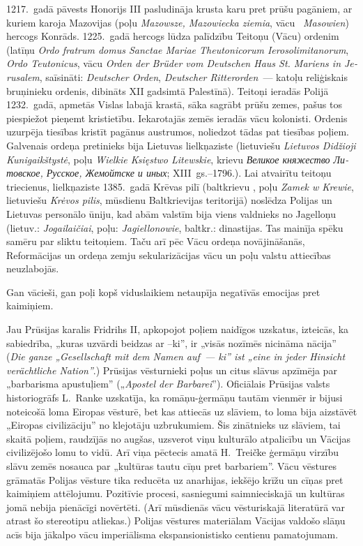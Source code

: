 \documentclass[twoside,a5paper,12pt,fleqn,openany]{extbook}
\newcommand{\pltxti}[1]{\textit{\textpolish{#1}}}
\newcommand{\rutxti}[1]{\textit{\textrussian{#1}}}
\newcommand{\detxti}[1]{\textit{\textgerman{#1}}}
\newcommand{\lttxti}[1]{\textit{\textlithuanian{#1}}}
\newcommand{\latxti}[1]{\textit{\textlatin{#1}}}
\newcommand{\betxti}[1]{\textit{\textbelarusian{#1}}}
\begin{document}
1217.~gadā pāvests Honorijs III pasludināja krusta karu pret prūšu pagāniem, ar kuriem karoja Mazovijas (poļu \pltxti{Mazowsze, Mazowiecka ziemia}, vācu ~\detxti{Masowien}) hercogs Konrāds. 1225.~gadā hercogs lūdza palīdzību Teitoņu (Vācu) ordenim (latīņu \latxti{Ordo fratrum domus Sanctae Mariae Theutonicorum Ierosolimitanorum}, \latxti{Ordo Teutonicus}, vācu \detxti{Orden der Brüder vom Deutschen Haus St. Mariens in Jerusalem}, saīsināti: \detxti{Deutscher Orden}, \detxti{Deutscher Ritterorden}~--- katoļu reliģiskais bruņinieku ordenis, dibināts XII gadsimtā Palestīnā). Teitoņi ieradās Polijā 1232.~gadā, apmetās Vislas labajā krastā, sāka sagrābt prūšu zemes, pašus tos piespiežot pieņemt kristietību. Iekarotajās zemēs ieradās vācu kolonisti. Ordenis uzurpēja tiesības kristīt pagānus austrumos, noliedzot tādas pat tiesības poļiem. Galvenais ordeņa pretinieks bija Lietuvas lielkņaziste (lietuviešu \lttxti{Lietuvos Didžioji Kunigaikštystė}, poļu \pltxti{Wielkie Księstwo Litewskie}, krievu \rutxti{Великое княжество Литовское, Русское, Жемойтске и иных}; XIII~gs.--1796.). Lai atvairītu teitoņu triecienus, lielkņaziste 1385.~gadā Krēvas pilī (baltkrievu \betxti{Крэўскі замак}, poļu \pltxti{Zamek w Krewie}, lietuviešu \lttxti{Krėvos pilis}, mūsdienu Baltkrievijas teritorijā) noslēdza Polijas un Lietuvas personālo ūniju, kad abām valstīm bija viens valdnieks no Jagelloņu (lietuv.: \lttxti{Jogailaičiai}, poļu: \pltxti{Jagiellonowie}, baltkr.: \betxti{Ягелоны)} dinastijas. Tas mainīja spēku samēru par sliktu teitoņiem. Taču arī pēc Vācu ordeņa novājināšanās, Reformācijas un ordeņa zemju sekularizācijas vācu un poļu valstu attiecības neuzlabojās.

Gan vācieši, gan poļi kopš viduslaikiem netaupīja negatīvās emocijas pret kaimiņiem.

Jau Prūsijas karalis Fridrihs II, apkopojot poļiem naidīgos uzskatus, izteicās, ka sabiedrība, „kuras uzvārdi beidzas ar --ki”, ir „visās nozīmēs nicināma nācija'' (\detxti{Die ganze „Gesellschaft mit dem Namen auf~--- ki” ist „eine in jeder Hinsicht verächtliche Nation”}.) Prūsijas vēsturnieki poļus un citus slāvus apzīmēja par „barbarisma apustuļiem” („\detxti{Apostel der Barbarei}”). Oficiālais Prūsijas valsts historiogrāfs L.~Ranke uzskatīja, ka romāņu-ģermāņu tautām vienmēr ir bijusi noteicošā loma Eiropas vēsturē, bet kas attiecās uz slāviem, to loma bija aizstāvēt „Eiropas civilizāciju” no klejotāju uzbrukumiem. Šis zinātnieks uz slāviem, tai skaitā poļiem, raudzījās no augšas, uzsverot viņu kulturālo atpalicību un Vācijas civilizējošo lomu to vidū. Arī viņa pēctecis amatā H.~Treičke ģermāņu virzību slāvu zemēs nosauca par „kultūras tautu cīņu pret barbariem”. Vācu vēstures grāmatās Polijas vēsture tika reducēta uz anarhijas, iekšējo krīžu un cīņas pret kaimiņiem attēlojumu. Pozitīvie procesi, sasniegumi saimnieciskajā un kultūras jomā nebija pienācīgi novērtēti. (Arī mūsdienās vācu vēsturiskajā literatūrā var atrast šo stereotipu atliekas.) Polijas vēstures materiālam Vācijas valdošo slāņu acīs bija jākalpo vācu imperiālisma ekspansionistisko centienu pamatojumam.
\end{document}
